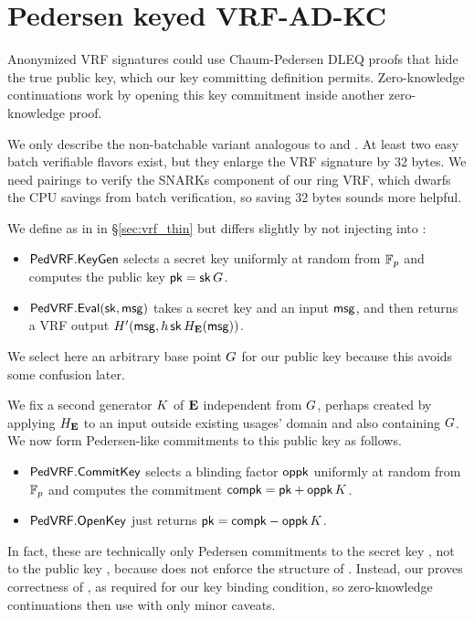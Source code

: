 \section{Pedersen keyed VRF-AD-KC}
\label{sec:vrf_pederson}

Anonymized VRF signatures could use Chaum-Pedersen DLEQ proofs that
hide the true public key, which our key committing definition permits.
Zero-knowledge continuations work by opening this key commitment
 inside another zero-knowledge proof. %

We only describe the non-batchable variant analogous to
 \cite{nsec5} and \cite{VXEd25519}.
At least two easy batch verifiable flavors exist, but
 they enlarge the VRF signature by 32 bytes.
We need pairings to verify the SNARKs component of our ring VRF,
which dwarfs the CPU savings from batch verification,
so saving 32 bytes sounds more helpful.


\newcommand{\PedVRF}{\primalgo{PedVRF}} 

We define \KeyGen as in \ThinVRF in \S\ref{sec:vrf_thin} but \Eval differs
slightly by not injecting \pk into \msg:
\begin{itemize}
\item $\PedVRF.\KeyGen$ selects a secret key \sk uniformly at random from $\mathbb{F}_p$ and computes the public key $\mathsf{pk} = \mathsf{sk} \, G$. 
\item $\PedVRF.\Eval(\sk,\msg)$ takes a secret key \sk and an input $\mathsf{msg}$, and
 then returns a VRF output $H'(\mathsf{msg},h \, \mathsf{sk} \, H_{{\mathbf{E}}}(\mathsf{msg}))$.
\end{itemize}
We select here an arbitrary base point $G$ for our public key
 because this avoids some confusion later.

We fix a second generator $K$ of ${\mathbf{E}}$ independent from $G$,
perhaps created by applying $H_{\mathbf{E}}$ to an input outside existing usages'
domain and also containing $G$. 
We now form Pedersen-like commitments to this public key \pk as follows.
\begin{itemize}
\item $\PedVRF.\CommitKey$ selects a blinding factor $\mathsf{oppk}$ uniformly
 at random from $\mathbb{F}_p$ and computes the commitment $\mathsf{compk} = \mathsf{pk} + \mathsf{oppk} \, K$.
\item $\PedVRF.\OpenKey$ just returns $\mathsf{pk} = \mathsf{compk} - \mathsf{oppk} \, K$.
\end{itemize}
In fact, these are technically only Pedersen commitments to
the secret key \sk, not to the public key \pk, because
 \OpenKey does not enforce the structure of \pk.
Instead, our \Verify proves correctness of \compk, as
 required for our key binding condition, so
zero-knowledge continuations then use \OpenKey with only minor caveats.

